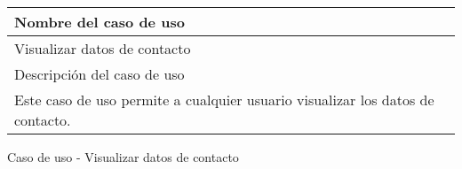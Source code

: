 \begin{identificacionCasoDeUso}
	\begin{tabular} { | p{17cm} |}
		\hline
		Nombre del caso de uso                                                         \\ \hline
		Visualizar datos de contacto                                                   \\ \hline
		Descripción del caso de uso                                                    \\ \hline
		Este caso de uso permite a cualquier usuario visualizar los datos de contacto. \\ \hline
	\end{tabular}
	\caption{Caso de uso - Visualizar datos de contacto}
\end{identificacionCasoDeUso}